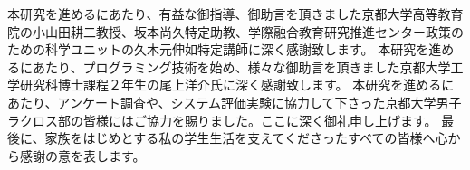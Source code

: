 \documentclass[sotsuron]{kuee}
\begin{document}
\begin{acknowledgements}
 本研究を進めるにあたり、有益な御指導、御助言を頂きました京都大学高等教育院の小山田耕二教授、坂本尚久特定助教、学際融合教育研究推進センター政策のための科学ユニットの久木元伸如特定講師に深く感謝致します。
本研究を進めるにあたり、プログラミング技術を始め、様々な御助言を頂きました京都大学工学研究科博士課程２年生の尾上洋介氏に深く感謝致します。
本研究を進めるにあたり、アンケート調査や、システム評価実験に協力して下さった京都大学男子ラクロス部の皆様にはご協力を賜りました。ここに深く御礼申し上げます。
最後に、家族をはじめとする私の学生生活を支えてくださったすべての皆様へ心から感謝の意を表します。
\end{acknowledgements}








\appendix
\end{document}
